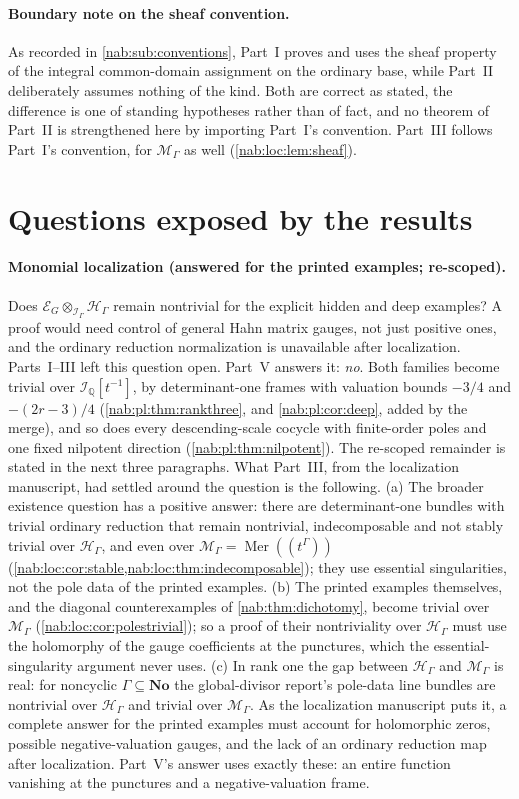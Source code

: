 \documentclass[11pt,letterpaper]{article}
\theoremstyle{definition}
\theoremstyle{remark}
\newcommand{\Q}{\mathbb Q}
\newcommand{\No}{\mathbf{No}}
\newcommand{\HH}{\mathscr H_\Gamma}
\newcommand{\II}{\mathscr I_\Gamma}
\newcommand{\MM}{\mathscr M_\Gamma}
\newcommand{\Mer}{\operatorname{Mer}}
\numberwithin{equation}{section}
\begin{document}
\paragraph{Boundary note on the sheaf convention.}
As recorded in \cref{nab:sub:conventions}, Part~I proves and uses the sheaf
property of the integral common-domain assignment on the ordinary base, while
Part~II deliberately assumes nothing of the kind. Both are correct as stated,
the difference is one of standing hypotheses rather than of fact, and no
theorem of Part~II is strengthened here by importing Part~I's convention.
Part~III follows Part~I's convention, for $\MM$ as well
(\cref{nab:loc:lem:sheaf}).

\section{Questions exposed by the results}\label{nab:sec:open}

\paragraph{Monomial localization (answered for the printed examples;
re-scoped).}
Does $\mathcal E_G\otimes_{\II}\HH$ remain nontrivial for the explicit hidden
and deep examples? A proof would need control of general Hahn matrix gauges,
not just positive ones, and the ordinary reduction normalization is unavailable
after localization. Parts~I--III left this question open. Part~V answers it:
\emph{no}. Both families become trivial over $\mathscr I_{\Q}[t^{-1}]$, by
determinant-one frames with valuation bounds $-3/4$ and $-(2r-3)/4$
(\cref{nab:pl:thm:rankthree}, and \cref{nab:pl:cor:deep}, added by the merge),
and so does every descending-scale cocycle with finite-order poles and one fixed
nilpotent direction (\cref{nab:pl:thm:nilpotent}). The re-scoped remainder is
stated in the next three paragraphs. What Part~III, from the localization
manuscript, had settled around the question is the following. (a) The broader existence question has
a positive answer: there are determinant-one bundles with trivial ordinary
reduction that remain nontrivial, indecomposable and not stably trivial over
$\HH$, and even over $\MM=\Mer((t^\Gamma))$
(\cref{nab:loc:cor:stable,nab:loc:thm:indecomposable}); they use essential
singularities, not the pole data of the printed examples. (b) The printed
examples themselves, and the diagonal counterexamples of
\cref{nab:thm:dichotomy}, become trivial over $\MM$
(\cref{nab:loc:cor:polestrivial}); so a proof of their nontriviality over $\HH$
must use the holomorphy of the gauge coefficients at the punctures, which the
essential-singularity argument never uses. (c) In rank one the gap between
$\HH$ and $\MM$ is real: for noncyclic $\Gamma\subseteq\No$ the global-divisor
report's pole-data line bundles are nontrivial over $\HH$ and trivial over
$\MM$. As the localization manuscript
puts it, a complete answer for the printed examples must account for
holomorphic zeros, possible negative-valuation gauges, and the lack of an
ordinary reduction map after localization. Part~V's answer uses exactly these:
an entire function vanishing at the punctures and a negative-valuation frame.
\end{document}
